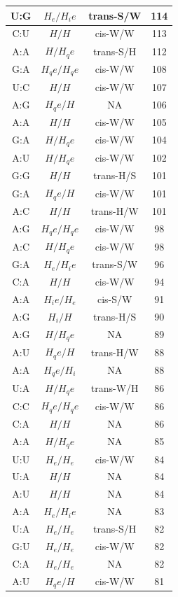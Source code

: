 \begin{center}
\begin{longtable}{c|c|c|c}
U:G & $H_e/H_ie$ & trans-S/W & 114 \\  \hline
C:U & $H/H$ & cis-W/W & 113 \\  \hline
A:A & $H/H_qe$ & trans-S/H & 112 \\  \hline
G:A & $H_qe/H_qe$ & cis-W/W & 108 \\  \hline
U:C & $H/H$ & cis-W/W & 107 \\  \hline
A:G & $H_qe/H$ & NA & 106 \\  \hline
A:A & $H/H$ & cis-W/W & 105 \\  \hline
G:A & $H/H_qe$ & cis-W/W & 104 \\  \hline
A:U & $H/H_qe$ & cis-W/W & 102 \\  \hline
G:G & $H/H$ & trans-H/S & 101 \\  \hline
G:A & $H_qe/H$ & cis-W/W & 101 \\  \hline
A:C & $H/H$ & trans-H/W & 101 \\  \hline
A:G & $H_qe/H_qe$ & cis-W/W & 98 \\  \hline
A:C & $H/H_qe$ & cis-W/W & 98 \\  \hline
G:A & $H_e/H_ie$ & trans-S/W & 96 \\  \hline
C:A & $H/H$ & cis-W/W & 94 \\  \hline
A:A & $H_ie/H_e$ & cis-S/W & 91 \\  \hline
A:G & $H_i/H$ & trans-H/S & 90 \\  \hline
A:G & $H/H_qe$ & NA & 89 \\  \hline
A:U & $H_qe/H$ & trans-H/W & 88 \\  \hline
A:A & $H_qe/H_i$ & NA & 88 \\  \hline
U:A & $H/H_qe$ & trans-W/H & 86 \\  \hline
C:C & $H_qe/H_qe$ & cis-W/W & 86 \\  \hline
C:A & $H/H$ & NA & 86 \\  \hline
A:A & $H/H_qe$ & NA & 85 \\  \hline
U:U & $H_e/H_e$ & cis-W/W & 84 \\  \hline
U:A & $H/H$ & NA & 84 \\  \hline
A:U & $H/H$ & NA & 84 \\  \hline
A:A & $H_e/H_ie$ & NA & 83 \\  \hline
U:A & $H_e/H_e$ & trans-S/H & 82 \\  \hline
G:U & $H_e/H_e$ & cis-W/W & 82 \\  \hline
C:A & $H_e/H_e$ & NA & 82 \\  \hline
A:U & $H_qe/H$ & cis-W/W & 81 \\  \hline

\end{longtable}
\end{center}
